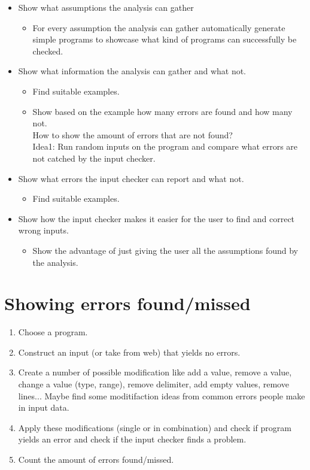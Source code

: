 \documentclass[11pt]{article}
\begin{document}
\begin{itemize}
  \item Show what assumptions the analysis can gather
  \begin{itemize}
    \item For every assumption the analysis can gather automatically generate simple programs to showcase what kind of programs can successfully be checked.
  \end{itemize}
  \item Show what information the analysis can gather and what not.
  \begin{itemize}
    \item Find suitable examples.
    \item Show based on the example how many errors are found and how many not.\\
    How to show the amount of errors that are not found?\\
    Idea1: Run random inputs on the program and compare what errors are not catched by the input checker.
  \end{itemize}
  \item Show what errors the input checker can report and what not.
  \begin{itemize}
    \item Find suitable examples.
  \end{itemize}
  \item Show how the input checker makes it easier for the user to find and correct wrong inputs.
  \begin{itemize}
    \item Show the advantage of just giving the user all the assumptions found by the analysis.
  \end{itemize}
\end{itemize}


\section{Showing errors found/missed}

\begin{enumerate}
  \item Choose a program.
  \item Construct an input (or take from web) that yields no errors.
  \item Create a number of possible modification like add a value, remove a value, change a value (type, range), remove delimiter, add empty values, remove lines... Maybe find some moditifaction ideas from common errors people make in input data.
  \item Apply these modifications (single or in combination) and check if program yields an error and check if the input checker finds a problem.
  \item Count the amount of errors found/missed.
\end{enumerate}
\end{document}
